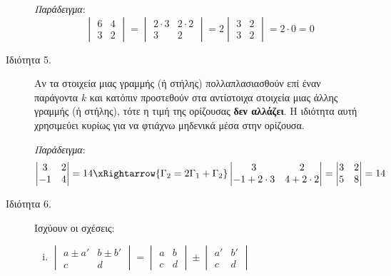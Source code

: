 \documentclass[a4paper,table]{report}
\begin{document}
\begin{description}
    \textit{Παράδειγμα}: 
    \[
      \begin{vmatrix}
        6 & 4\\
        3 & 2 
        \end{vmatrix} = \begin{vmatrix}
        2\cdot 3 & 2\cdot 2\\
        3 & 2 
        \end{vmatrix} = 2\begin{vmatrix}
        3 & 2 \\
        3 & 2 
      \end{vmatrix}=2\cdot 0 = 0
    \]

  \item[Ιδιότητα 5.] Αν τα στοιχεία μιας γραμμής (ή στήλης) πολλαπλασιασθούν επί 
    έναν παράγοντα $k$ και κατόπιν προστεθούν στα αντίστοιχα στοιχεία μιας άλλης 
    γραμμής (ή στήλης), τότε η τιμή της ορίζουσας \textbf{δεν αλλάζει}. Η ιδιότητα 
    αυτή χρησιμεύει κυρίως για να φτιάχνω μηδενικά μέσα στην ορίζουσα.

    \textit{Παράδειγμα}:
    \[
      \begin{vmatrix}
        3 & 2\\
        -1 & 4
      \end{vmatrix}=14
      \xRightarrow{\Gamma_2=2\Gamma_1+\Gamma_2}\begin{vmatrix}
        3 & 2 \\
        -1 + 2\cdot 3 & 4 + 2\cdot 2 
        \end{vmatrix}=\begin{vmatrix}
        3 & 2\\
        5 & 8 
      \end{vmatrix}=14
    \]

  \item[Ιδιότητα 6.] Ισχύουν οι σχέσεις:
    \begin{enumerate}[i),itemsep=\baselineskip]

      \item $
        \begin{vmatrix}
          a\pm a' & b\pm b'\\
          c & d 
        \end{vmatrix}
        =
        \begin{vmatrix}
          a & b \\
          c & d 
        \end{vmatrix}
        \pm
        \begin{vmatrix}
          a' & b' \\
          c & d 
        \end{vmatrix}
        $


\end{enumerate}
\end{description}
\end{document}
